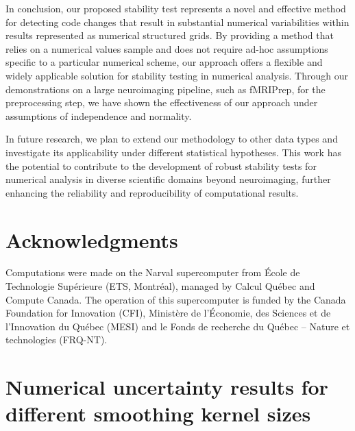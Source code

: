 \documentclass[lettersize,journal]{IEEEtran}
\newcommand{\fmriprep}{fMRIPrep\xspace}
\begin{document}
In conclusion, our proposed stability test represents a novel and effective method for detecting code changes that result in substantial numerical variabilities within results represented as numerical structured grids. By providing a method that relies on a numerical values sample and does not require ad-hoc assumptions specific to a particular numerical scheme, our approach offers a flexible and widely applicable solution for stability testing in numerical analysis.
Through our demonstrations on a large neuroimaging pipeline, such as \fmriprep, for the preprocessing step, we have shown the effectiveness of our approach under assumptions of independence and normality.

In future research, we plan to extend our methodology to other data types and investigate its applicability under different statistical hypotheses. This work has the potential to contribute to the development of robust stability tests for numerical analysis in diverse scientific domains beyond neuroimaging, further enhancing the reliability and reproducibility of computational results.

\section{Acknowledgments}

Computations were made on the Narval supercomputer from \'Ecole de Technologie
Sup\'erieure (ETS, Montr\'eal), managed by Calcul Québec and Compute Canada. The
operation of this supercomputer is funded by the Canada Foundation for
Innovation (CFI), Ministère de l’Économie, des Sciences et de l’Innovation du
Québec (MESI) and le Fonds de recherche du Québec – Nature et technologies
(FRQ-NT).

\appendix 

\section{Numerical uncertainty results for different smoothing kernel sizes}
\label{appendix:numerical_uncertainty}
\end{document}
